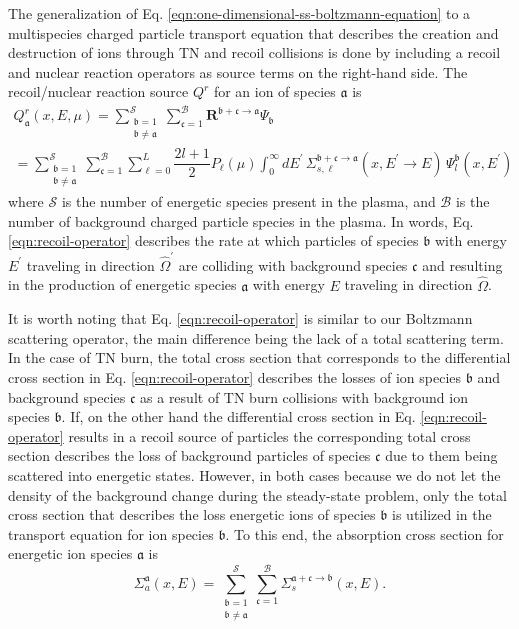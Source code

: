 The generalization of Eq. \eqref{eqn:one-dimensional-ss-boltzmann-equation} to a multispecies charged particle transport equation that describes the creation and destruction of ions through TN and recoil collisions is done by including a recoil and nuclear reaction operators as source terms on the right-hand side. The recoil/nuclear reaction source $Q^r$ for an ion of species $\mathfrak{a}$ is
\begin{multline} \label{eqn:recoil-operator}
  Q_{\mathfrak{a}}^r(x,E,\mu) = \sum_{\substack{\mathfrak{b} = 1 \\ \mathfrak{b} \neq \mathfrak{a}}}^{\mathcal{S}} \sum_{\mathfrak{c} = 1}^{\mathcal{B}} \boldsymbol{R}^{\mathfrak{b} + \mathfrak{c} \rightarrow \mathfrak{a}} \Psi_{\mathfrak{b}} \\ = \sum_{\substack{\mathfrak{b} = 1 \\ \mathfrak{b} \neq \mathfrak{a}}}^{\mathcal{S}} \sum_{\mathfrak{c} = 1}^{\mathcal{B}} \sum_{\ell = 0}^L \dfrac{2l+1}{2} P_{\ell}(\mu) \int_{0}^{\infty} dE^{\prime} \, \Sigma_{s,\ell}^{\mathfrak{b} + \mathfrak{c} \rightarrow \mathfrak{a}}(x, E^{\prime}\rightarrow E) \, \Psi_{l}^{\mathfrak{b}}(x,E^{\prime})
\end{multline}
where $\mathcal{S}$ is the number of energetic species present in the plasma, and $\mathcal{B}$ is the number of background charged particle species in the plasma. In words, Eq. \eqref{eqn:recoil-operator} describes the rate at which particles of species $\mathfrak{b}$ with energy $E^{\prime}$ traveling in direction $\hat{\Omega}^{\prime}$ are colliding with background species $\mathfrak{c}$ and resulting in the production of energetic species $\mathfrak{a}$ with energy $E$ traveling in direction $\hat{\Omega}$.

It is worth noting that Eq. \eqref{eqn:recoil-operator} is similar to our Boltzmann scattering operator, the main difference being the lack of a total scattering term. In the case of TN burn, the total cross section that corresponds to the differential cross section in Eq. \eqref{eqn:recoil-operator} describes the losses of ion species $\mathfrak{b}$ and background species $\mathfrak{c}$ as a result of TN burn collisions with background ion species $\mathfrak{b}$. If, on the other hand the differential cross section in Eq. \eqref{eqn:recoil-operator} results in a recoil source of particles the corresponding total cross section describes the loss of background particles of species $\mathfrak{c}$ due to them being scattered into energetic states. However, in both cases because we do not let the density of the background change during the steady-state problem, only the total cross section that describes the loss energetic ions of species $\mathfrak{b}$ is utilized in the transport equation for ion species $\mathfrak{b}$. To this end, the absorption cross section for energetic ion species $\mathfrak{a}$ is
\begin{equation} \label{eqn:multispecies-absorption}
  \Sigma_a^{\mathfrak{a}}(x,E) = \sum_{\substack{\mathfrak{b} = 1 \\ \mathfrak{b} \neq \mathfrak{a}}}^{\mathcal{S}} \sum_{\mathfrak{c} = 1}^{\mathcal{B}} \Sigma_{s}^{\mathfrak{a}+\mathfrak{c}\rightarrow\mathfrak{b}}(x,E).
\end{equation}

